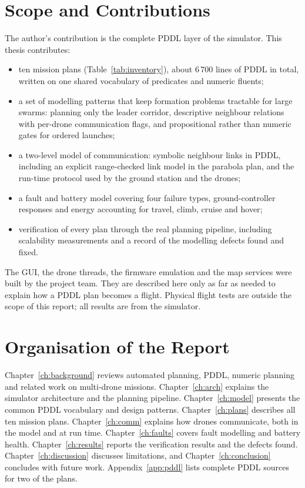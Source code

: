 \documentclass[11pt,a4paper,oneside]{report}
\begin{document}
\section{Scope and Contributions}
The author's contribution is the complete PDDL layer of the simulator. This thesis contributes:
\begin{itemize}
  \item ten mission plans (Table~\ref{tab:inventory}), about 6\,700 lines of PDDL in total,
        written on one shared vocabulary of predicates and numeric fluents;
  \item a set of modelling patterns that keep formation problems tractable for large swarms:
        planning only the leader corridor, descriptive neighbour relations with per-drone
        communication flags, and propositional rather than numeric gates for ordered launches;
  \item a two-level model of communication: symbolic neighbour links in PDDL, including an
        explicit range-checked link model in the parabola plan, and the run-time protocol used
        by the ground station and the drones;
  \item a fault and battery model covering four failure types, ground-controller responses and
        energy accounting for travel, climb, cruise and hover;
  \item verification of every plan through the real planning pipeline, including scalability
        measurements and a record of the modelling defects found and fixed.
\end{itemize}

The GUI, the drone threads, the firmware emulation and the map services were built by the
project team. They are described here only as far as needed to explain how a PDDL plan
becomes a flight. Physical flight tests are outside the scope of this report; all results
are from the simulator.

\section{Organisation of the Report}
Chapter~\ref{ch:background} reviews automated planning, PDDL, numeric planning and related work
on multi-drone missions. Chapter~\ref{ch:arch} explains the simulator architecture and the
planning pipeline. Chapter~\ref{ch:model} presents the common PDDL vocabulary and design
patterns. Chapter~\ref{ch:plans} describes all ten mission plans. Chapter~\ref{ch:comm}
explains how drones communicate, both in the model and at run time. Chapter~\ref{ch:faults}
covers fault modelling and battery health. Chapter~\ref{ch:results} reports the verification
results and the defects found. Chapter~\ref{ch:discussion} discusses limitations, and
Chapter~\ref{ch:conclusion} concludes with future work. Appendix~\ref{app:pddl} lists complete
PDDL sources for two of the plans.
\end{document}

